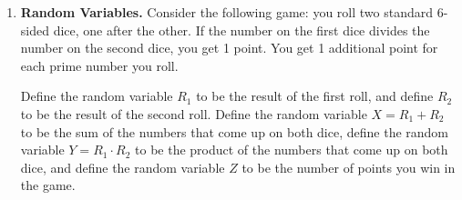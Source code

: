 \documentclass[11pt, preview]{standalone} %
\date{} %
\begin{document}

\begin{enumerate}
\item {\bf Random Variables.} Consider the following game: you roll two standard 6-sided dice, one after the other. If the number on the first dice divides the number on the second dice, you get 1 point. You get 1 additional point for each prime number you roll.

Define the random variable $R_1$ to be the result of the first roll, and define $R_2$ to be the result of the second roll. Define the random variable $X = R_1 + R_2$ to be the sum of the numbers that come up on both dice, define the random variable $Y = R_1 \cdot R_2$ to be the product of the numbers that come up on both dice, and define the random variable $Z$ to be the number of points you win in the game.


\end{enumerate}
\end{document}
